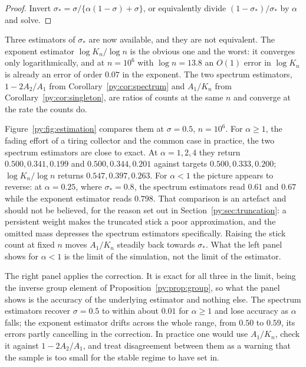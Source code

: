 \begin{proof}
Invert $\sigma_* = \sigma/\{\alpha(1-\sigma)+\sigma\}$, or equivalently divide
$(1-\sigma_*)/\sigma_*$ by $\alpha$ and solve.
\end{proof}

Three estimators of $\sigma_*$ are now available, and they are not equivalent. The exponent
estimator $\log K_n/\log n$ is the obvious one and the worst: it converges only logarithmically,
and at $n = 10^{6}$ with $\log n = 13.8$ an $O(1)$ error in $\log K_n$ is already an error of
order $0.07$ in the exponent. The two spectrum estimators, $1-2A_2/A_1$ from
Corollary~\ref{py:cor:spectrum} and $A_1/K_n$ from Corollary~\ref{py:cor:singleton}, are ratios of counts
at the same $n$ and converge at the rate the counts do.

Figure~\ref{py:fig:estimation} compares them at $\sigma = 0.5$, $n = 10^{6}$. For $\alpha \ge 1$, the fading effort of a tiring collector and the common case in practice, the
two spectrum estimators are close to exact. At $\alpha = 1, 2, 4$ they return $0.500, 0.341, 0.199$
and $0.500, 0.344, 0.201$ against targets $0.500, 0.333, 0.200$; $\log K_n/\log n$ returns
$0.547, 0.397, 0.263$. For $\alpha < 1$ the picture appears to reverse: at $\alpha = 0.25$, where $\sigma_* = 0.8$, the
spectrum estimators read $0.61$ and $0.67$ while the exponent estimator reads $0.798$. That
comparison is an artefact and should not be believed, for the reason set out in
Section~\ref{py:sec:truncation}: a persistent weight makes the truncated stick a poor approximation, and
the omitted mass depresses the spectrum estimators specifically. Raising the stick count at fixed
$n$ moves $A_1/K_n$ steadily back towards $\sigma_*$. What the left panel shows for $\alpha < 1$ is
the limit of the simulation, not the limit of the estimator.

The right panel applies the correction. It is exact for all three in the limit, being the inverse
group element of Proposition~\ref{py:prop:group}, so what the panel shows is the accuracy of the
underlying estimator and nothing else. The spectrum estimators recover $\sigma = 0.5$ to within
about $0.01$ for $\alpha \ge 1$ and lose accuracy as $\alpha$ falls; the exponent estimator drifts across
the whole range, from $0.50$ to $0.59$, its errors partly cancelling in the correction. In practice
one would use $A_1/K_n$, check it against $1-2A_2/A_1$, and treat disagreement between them as a
warning that the sample is too small for the stable regime to have set in.


